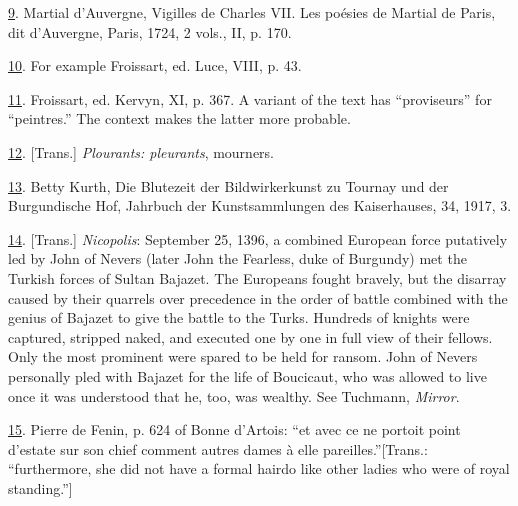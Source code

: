 \protect\hypertarget{23_NOTES.xhtmlux5cux23id_455}{\protect\hyperlink{20_ILLUSTRATIONS_FOLLOW_PAGE.xhtmlux5cux23id_454}{9}}.
Martial d'Auvergne, Vigilles de Charles VII. Les poésies de Martial de
Paris, dit d'Auvergne, Paris, 1724, 2 vols., II, p. 170.

\protect\hypertarget{23_NOTES.xhtmlux5cux23page_432}{\protect\hyperlink{20_ILLUSTRATIONS_FOLLOW_PAGE.xhtmlux5cux23id_453}{10}}.
For example Froissart, ed. Luce, VIII, p. 43.

\protect\hypertarget{23_NOTES.xhtmlux5cux23id_452}{\protect\hyperlink{20_ILLUSTRATIONS_FOLLOW_PAGE.xhtmlux5cux23id_451}{11}}.
Froissart, ed. Kervyn, XI, p. 367. A variant of the text has
``proviseurs'' for ``peintres.'' The context makes the latter more
probable.

\protect\hypertarget{23_NOTES.xhtmlux5cux23id_450}{\protect\hyperlink{20_ILLUSTRATIONS_FOLLOW_PAGE.xhtmlux5cux23id_449}{12}}.
{[}Trans.{]} \emph{Plourants: pleurants}, mourners.

\protect\hypertarget{23_NOTES.xhtmlux5cux23id_448}{\protect\hyperlink{20_ILLUSTRATIONS_FOLLOW_PAGE.xhtmlux5cux23id_447}{13}}.
Betty Kurth, Die Blutezeit der Bildwirkerkunst zu Tournay und der
Burgundische Hof, Jahrbuch der Kunstsammlungen des Kaiserhauses, 34,
1917, 3.

\protect\hypertarget{23_NOTES.xhtmlux5cux23id_446}{\protect\hyperlink{20_ILLUSTRATIONS_FOLLOW_PAGE.xhtmlux5cux23id_445}{14}}.
{[}Trans.{]} \emph{Nicopolis}: September 25, 1396, a combined European
force putatively led by John of Nevers (later John the Fearless, duke of
Burgundy) met the Turkish forces of Sultan Bajazet. The Europeans fought
bravely, but the disarray caused by their quarrels over precedence in
the order of battle combined with the genius of Bajazet to give the
battle to the Turks. Hundreds of knights were captured, stripped naked,
and executed one by one in full view of their fellows. Only the most
prominent were spared to be held for ransom. John of Nevers personally
pled with Bajazet for the life of Boucicaut, who was allowed to live
once it was understood that he, too, was wealthy. See Tuchmann,
\emph{Mirror}.

\protect\hypertarget{23_NOTES.xhtmlux5cux23id_444}{\protect\hyperlink{20_ILLUSTRATIONS_FOLLOW_PAGE.xhtmlux5cux23id_443}{15}}.
Pierre de Fenin, p. 624 of Bonne d'Artois: ``et avec ce ne portoit point
d'estate sur son chief comment autres dames à elle
pareilles.''{[}Trans.: ``furthermore, she did not have a formal hairdo
like other ladies who were of royal standing.''{]}

